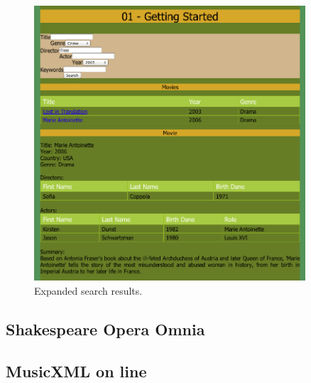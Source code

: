 \documentclass[a4paper, notitlepage]{article}
\begin{document}
\begin{figure}[ht]
\begin{center}
\includegraphics[width=0.9\textwidth]{01-3.png}
\caption{Expanded search results.}
\label{fig:01-3}
\end{center}
\end{figure}

\subsection{Shakespeare Opera Omnia}

\subsection{MusicXML on line}
\end{document}
